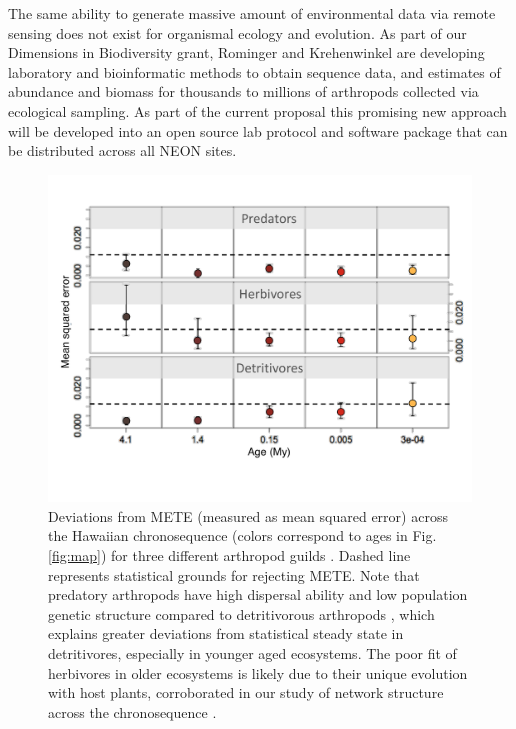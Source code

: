 \documentclass[11pt]{article}
\begin{document}
The same ability to generate massive amount of environmental data via
remote sensing does not exist for organismal ecology and evolution.
As part of our Dimensions in Biodiversity grant, Rominger and
Krehenwinkel are developing laboratory and bioinformatic methods to
obtain sequence data, and estimates of abundance and biomass for
thousands to millions of arthropods collected via ecological sampling.
As part of the current proposal this promising new approach will be
developed into an open source lab protocol and software package that
can be distributed across all NEON sites.

\begin{figure}[!htb]
  \centering
  \includegraphics[scale=0.4]{../figs/fig_meteAll.pdf}
  \caption{Deviations from METE (measured as mean squared error)
    across the Hawaiian chronosequence (colors correspond to ages in
    Fig. \ref{fig:map}) for three different arthropod guilds
    \citep[data from][]{gruner2007}.  Dashed line represents
    statistical grounds for rejecting METE. Note that predatory
    arthropods have high dispersal ability and low population genetic
    structure compared to detritivorous arthropods
    \citep{rominger2015}, which explains greater deviations from
    statistical steady state in detritivores, especially in younger
    aged ecosystems.  The poor fit of herbivores in older ecosystems
    is likely due to their unique evolution with host plants,
    corroborated in our study of network structure across the
    chronosequence \citep{rominger2015}.}
  \label{fig:meteAll}
\end{figure}
\end{document}
